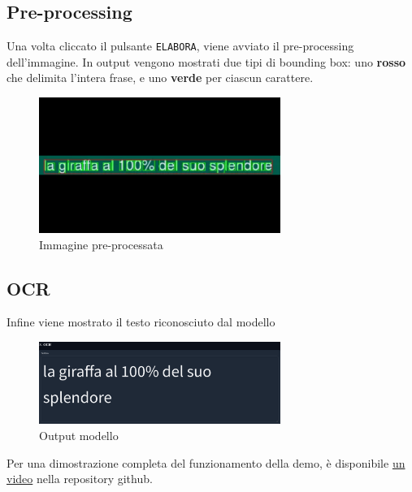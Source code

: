 \subsection*{Pre-processing}
Una volta cliccato il pulsante \texttt{ELABORA}, viene avviato il pre-processing dell'immagine. In output vengono mostrati due tipi di bounding box: uno \textbf{rosso} che delimita l'intera frase, e uno \textbf{verde} per ciascun carattere.

\begin{figure}[H]
    \centering
    \includegraphics[width=0.7\textwidth]{images/demo-2fasedetail.png}
    \caption{Immagine pre-processata}
    \label{fig:demo-2fase}
\end{figure}

\subsection*{OCR}
Infine viene mostrato il testo riconosciuto dal modello
\begin{figure}[H]
    \centering
    \includegraphics[width=0.7\textwidth]{images/demo-3fase.png}
    \caption{Output modello}
    \label{fig:demo-3fase}
\end{figure}

Per una dimostrazione completa del funzionamento della demo, è disponibile \href{https://github.com/user-attachments/assets/c438a7b3-e5fd-433e-a72f-7376223e9067}{un video} nella repository github.